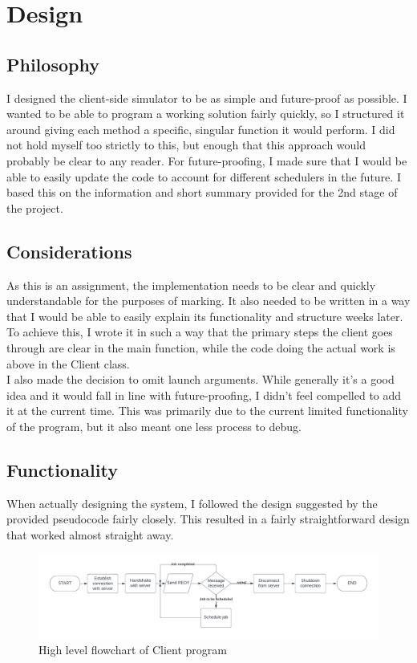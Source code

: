 \documentclass[a4paper]{article} %
\begin{document}
\clearpage
\section{Design}

\subsection{Philosophy}
I designed the client-side simulator to be as simple and future-proof as possible. I wanted to be able to program a working solution fairly quickly, so I structured it around giving each method a specific, singular function it would perform. I did not hold myself too strictly to this, but enough that this approach would probably be clear to any reader.
For future-proofing, I made sure that I would be able to easily update the code to account for different schedulers in the future. I based this on the information and short summary provided for the 2nd stage of the project.

\subsection{Considerations}
As this is an assignment, the implementation needs to be clear and quickly understandable for the purposes of marking. It also needed to be written in a way that I would be able to easily explain its functionality and structure weeks later. To achieve this, I wrote it in such a way that the primary steps the client goes through are clear in the main function, while the code doing the actual work is above in the Client class. \\
I also made the decision to omit launch arguments. While generally it's a good idea and it would fall in line with future-proofing, I didn't feel compelled to add it at the current time. This was primarily due to the current limited functionality of the program, but it also meant one less process to debug.

\subsection{Functionality}

When actually designing the system, I followed the design suggested by the provided pseudocode fairly closely. This resulted in a fairly straightforward design that worked almost straight away.

\begin{figure}[H]
	\centering
	\includegraphics[width=1.0\textwidth]{flowchart}
	\caption{High level flowchart of Client program}
\end{figure}
\end{document}
